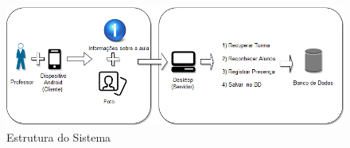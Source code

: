 

\begin{figure}[!ht]
	\centering
\includegraphics[width=1.0\textwidth]{img/diagramaintro.png}   
	\caption{Estrutura do Sistema}
	\label{fig:figura1}
\end{figure}

